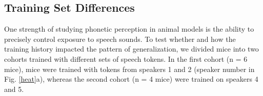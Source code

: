 \documentclass[preprint, NumberedRefs]{JASAnew}\usepackage[]{graphicx}\usepackage[]{color}
\begin{document}
\subsection{Training Set Differences}

%
%
%
%
One strength of studying phonetic perception in animal models is the ability to precisely control exposure to speech sounds. To test whether and how the training history impacted the pattern of generalization, we divided mice into two cohorts trained with different sets of speech tokens. In the first cohort (n = 6 mice), mice were trained with tokens from speakers 1 and 2 (speaker number in Fig. \ref{heat}a), whereas the second cohort (n = 4 mice) were trained on speakers 4 and 5.
\end{document}
